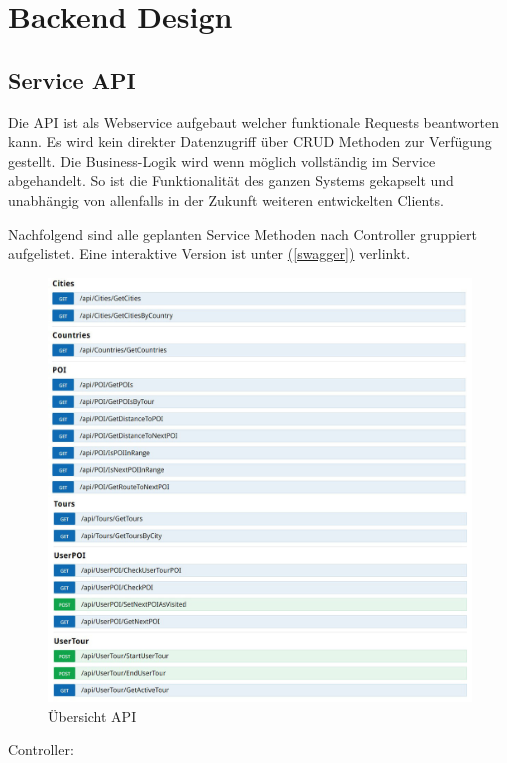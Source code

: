 \documentclass[a4paper,10pt,xetex]{article}
\newcommand*{\fullref}[1]{\hyperref[{#1}]{\nameref*{#1} (\ref*{#1})}}
\begin{document}
\section{Backend Design}\label{backend-design}
\subsection{Service API}\label{service-api}
Die API ist als Webservice aufgebaut welcher funktionale Requests beantworten kann. Es wird kein direkter Datenzugriff
\"uber CRUD Methoden zur Verf\"ugung gestellt. Die Business-Logik wird wenn m\"oglich vollst\"andig im Service
abgehandelt. So ist die Funktionalit\"at des ganzen Systems gekapselt und unabh\"angig von allenfalls in der Zukunft
weiteren entwickelten Clients.

Nachfolgend sind alle geplanten Service Methoden nach Controller gruppiert aufgelistet. Eine
interaktive Version ist unter \fullref{swagger} verlinkt.

\begin{figure}
  \centering
  \includegraphics{swagger}
  \caption{Übersicht API}
\end{figure}

Controller:
\end{document}
